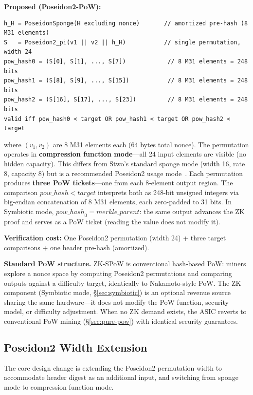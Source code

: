 \documentclass[11pt,a4paper]{article}
\begin{document}
\textbf{Proposed (Poseidon2-PoW):}
\begin{Verbatim}[fontsize=\small]
h_H = PoseidonSponge(H excluding nonce)       // amortized pre-hash (8 M31 elements)
S   = Poseidon2_pi(v1 || v2 || h_H)           // single permutation, width 24
pow_hash0 = (S[0], S[1], ..., S[7])            // 8 M31 elements = 248 bits
pow_hash1 = (S[8], S[9], ..., S[15])           // 8 M31 elements = 248 bits
pow_hash2 = (S[16], S[17], ..., S[23])         // 8 M31 elements = 248 bits
valid iff pow_hash0 < target OR pow_hash1 < target OR pow_hash2 < target
\end{Verbatim}
where $(v_1, v_2)$ are 8 M31 elements each (64 bytes total nonce). The permutation operates in \textbf{compression function mode}---all 24 input elements are visible (no hidden capacity). This differs from Stwo's standard sponge mode (width 16, rate 8, capacity 8) but is a recommended Poseidon2 usage mode~\cite{poseidon2}. Each permutation produces \textbf{three PoW tickets}---one from each 8-element output region. The comparison $\mathit{pow\_hash} < \mathit{target}$ interprets both as 248-bit unsigned integers via big-endian concatenation of 8 M31 elements, each zero-padded to 31 bits. In Symbiotic mode, $\mathit{pow\_hash}_0 = \mathit{merkle\_parent}$: the same output advances the ZK proof and serves as a PoW ticket (reading the value does not modify it).

\textbf{Verification cost:} One Poseidon2 permutation (width 24) + three target comparisons + one header pre-hash (amortized).

\textbf{Standard PoW structure.} ZK-SPoW is conventional hash-based PoW: miners explore a nonce space by computing Poseidon2 permutations and comparing outputs against a difficulty target, identically to Nakamoto-style PoW. The ZK component (Symbiotic mode, \S\ref{sec:symbiotic}) is an optional revenue source sharing the same hardware---it does not modify the PoW function, security model, or difficulty adjustment. When no ZK demand exists, the ASIC reverts to conventional PoW mining (\S\ref{sec:pure-pow}) with identical security guarantees.

\subsection{Poseidon2 Width Extension}
\label{sec:width}

The core design change is extending the Poseidon2 permutation width to accommodate header digest as an additional input, and switching from sponge mode to compression function mode.
\end{document}
